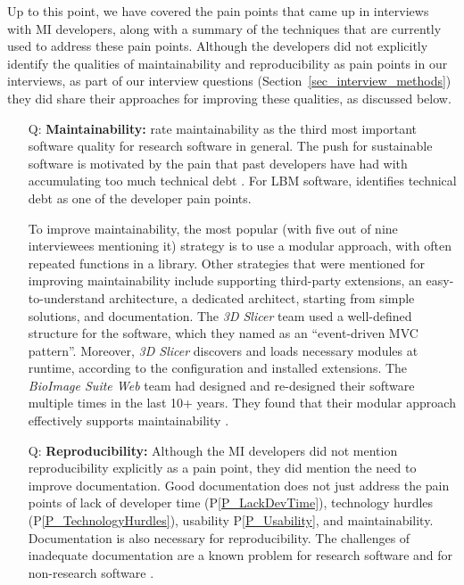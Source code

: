 \documentclass[final, 12pt, 3p, times]{elsarticle}
\newcommand{\ppref}[1]{P\ref{#1}}
\newcounter{qnum} %
\begin{document}
\begin{enumerate}
\end{enumerate}

Up to this point, we have covered the pain points that came up in interviews
with MI developers, along with a summary of the techniques that are currently
used to address these pain points.  Although the developers did not explicitly
identify the qualities of maintainability and reproducibility as pain points in
our interviews, as part of our interview questions
(Section~\ref{sec_interview_methods}) they did share their approaches for
improving these qualities, as discussed below.

\begin{enumerate}
\item[Q\refstepcounter{qnum}\theqnum \label{Q_Maintainability}:]
\textbf{Maintainability:} \cite{Nguyen-HoanEtAl2010} rate maintainability as the
third most important software quality for research software in general. The push
for sustainable software \cite{deSouzaEtAl2019} is motivated by the pain that
past developers have had with accumulating too much technical debt
\cite{KruchtenEtAl2012}.  For LBM software, \cite{SmithEtAl2024} identifies
technical debt as one of the developer pain points.

To improve maintainability, the most popular (with five out of nine interviewees
mentioning it) strategy is to use a modular approach, with often repeated
functions in a library.  Other strategies that were mentioned for improving
maintainability include supporting third-party extensions, an easy-to-understand
architecture, a dedicated architect, starting from simple solutions, and
documentation.  The \textit{3D Slicer} team used a well-defined structure for
the software, which they named as an ``event-driven MVC pattern''. Moreover,
\textit{3D Slicer} discovers and loads necessary modules at runtime, according
to the configuration and installed extensions. The \textit{BioImage Suite Web}
team had designed and re-designed their software multiple times in the last 10+
years. They found that their modular approach effectively supports
maintainability \cite{Joshi2011}. 

\item[Q\refstepcounter{qnum}\theqnum \label{Q_Reproducibility}:]
\textbf{Reproducibility:}  Although the MI developers did not mention
reproducibility explicitly as a pain point, they did mention the need to improve
documentation.  Good documentation does not just address the pain points of lack
of developer time (\ppref{P_LackDevTime}), technology hurdles
(\ppref{P_TechnologyHurdles}), usability \ppref{P_Usability}, and
maintainability.  Documentation is also necessary for reproducibility. The
challenges of inadequate documentation are a known problem for research software
\cite{PintoEtAl2018, WieseEtAl2019} and for non-research software
\cite{LethbridgeEtAl2003}. 


\end{enumerate}
\end{document}

